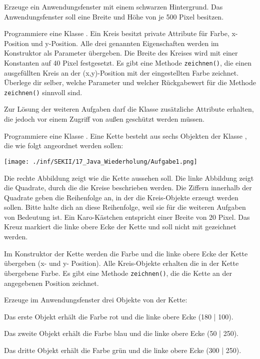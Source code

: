 \begin{compactenum}[a)]
\item Erzeuge ein Anwendungsfenster mit einem schwarzen Hintergrund. Das
Anwendungsfenster soll eine Breite und Höhe von je 500 Pixel besitzen.

\item Programmiere eine Klasse . Ein Kreis besitzt private
Attribute für Farbe, x-Position und y-Position. Alle drei genannten Eigenschaften werden im
Konstruktor als Parameter übergeben. Die Breite des Kreises wird mit einer
Konstanten auf 40 Pixel festgesetzt. Es gibt eine Methode \verb|zeichnen()|, die
einen ausgefüllten Kreis an der (x,y)-Position mit der eingestellten Farbe
zeichnet. Überlege dir selber, welche Parameter und welcher Rückgabewert für
die Methode \verb|zeichnen()| sinnvoll sind.

Zur Lösung der weiteren Aufgaben darf die Klasse  zusätzliche
Attribute erhalten, die jedoch vor einem Zugriff von außen geschützt werden müssen.

\item Programmiere eine Klasse . Eine Kette besteht aus sechs
Objekten der Klasse , die wie folgt angeordnet werden sollen:

\begin{center}
\texttt{[image: ./inf/SEKII/17\_Java\_Wiederholung/Aufgabe1.png]}
\end{center}

Die rechte Abbildung zeigt wie die Kette aussehen soll. Die linke
Abbildung zeigt die Quadrate, durch die die Kreise beschrieben werden. Die
Ziffern innerhalb der Quadrate geben die Reihenfolge an, in der die
Kreis-Objekte erzeugt werden sollen. Bitte halte dich an diese Reihenfolge,
weil sie für die weiteren Aufgaben von Bedeutung ist. Ein Karo-Kästchen
entspricht einer Breite von 20 Pixel. Das Kreuz markiert die linke obere Ecke
der Kette und soll nicht mit gezeichnet werden.

Im Konstruktor der Kette werden die Farbe und die linke obere Ecke der Kette
übergeben (x- und y- Position). Alle Kreis-Objekte erhalten die in der Kette
übergebene Farbe. Es gibt eine Methode \verb|zeichnen()|, die die Kette an der
angegebenen Position zeichnet.

Erzeuge im Anwendungsfenster drei Objekte von der Kette:
\begin{compactitem}
\item Das erste Objekt erhält die Farbe rot und die linke obere Ecke (180 | 100).
\item Das zweite Objekt erhält die Farbe blau und die linke obere Ecke (50 | 250).
\item Das dritte Objekt erhält die Farbe grün und die linke obere Ecke (300 | 250).
\end{compactitem}


\end{compactenum}
